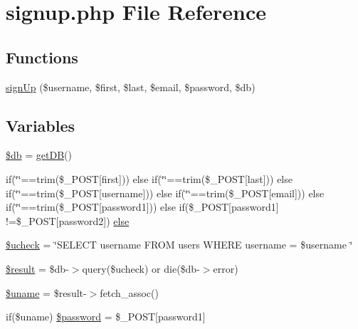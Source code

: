 \hypertarget{signup_8php}{}\section{signup.\+php File Reference}
\label{signup_8php}
\subsection*{Functions}
\begin{DoxyCompactItemize}
\item 
\mbox{\hyperlink{signup_8php_aed15c17c9da92081945e8ee167bdf7a0}{sign\+Up}} (\$username, \$first, \$last, \$email, \$password, \$db)
\end{DoxyCompactItemize}
\subsection*{Variables}
\begin{DoxyCompactItemize}
\item 
\mbox{\hyperlink{signup_8php_a1fa3127fc82f96b1436d871ef02be319}{\$db}} = \mbox{\hyperlink{database_8php_a4162847310de81b83504109485866a7c}{get\+DB}}()
\item 
if(\char`\"{}\char`\"{}==trim(\$\+\_\+\+P\+O\+ST\mbox{[}\textquotesingle{}first\textquotesingle{}\mbox{]})) else if(\char`\"{}\char`\"{}==trim(\$\+\_\+\+P\+O\+ST\mbox{[}\textquotesingle{}last\textquotesingle{}\mbox{]})) else if(\char`\"{}\char`\"{}==trim(\$\+\_\+\+P\+O\+ST\mbox{[}\textquotesingle{}username\textquotesingle{}\mbox{]})) else if(\char`\"{}\char`\"{}==trim(\$\+\_\+\+P\+O\+ST\mbox{[}\textquotesingle{}email\textquotesingle{}\mbox{]})) else if(\char`\"{}\char`\"{}==trim(\$\+\_\+\+P\+O\+ST\mbox{[}\textquotesingle{}password1\textquotesingle{}\mbox{]})) else if(\$\+\_\+\+P\+O\+ST\mbox{[}\textquotesingle{}password1\textquotesingle{}\mbox{]} !=\$\+\_\+\+P\+O\+ST\mbox{[}\textquotesingle{}password2\textquotesingle{}\mbox{]}) \mbox{\hyperlink{signup_8php_a12e81082faa4fe8fec9874c6510a4b5a}{else}}
\item 
\mbox{\hyperlink{signup_8php_ab8fb2b266e6115a51d358bee61a9173a}{\$ucheck}} = \char`\"{}S\+E\+L\+E\+CT username F\+R\+OM users W\+H\+E\+RE username = \textquotesingle{}\$username\textquotesingle{} \char`\"{}
\item 
\mbox{\hyperlink{signup_8php_a112ef069ddc0454086e3d1e6d8d55d07}{\$result}} = \$db-\/$>$query(\$ucheck) or die(\$db-\/$>$error)
\item 
\mbox{\hyperlink{signup_8php_a227a9443cabbe5e23cfc10c4371e09d1}{\$uname}} = \$result-\/$>$fetch\+\_\+assoc()
\item 
if(\$uname) \mbox{\hyperlink{signup_8php_a607686ef9f99ea7c42f4f3dd3dbb2b0d}{\$password}} = \$\+\_\+\+P\+O\+ST\mbox{[}\textquotesingle{}password1\textquotesingle{}\mbox{]}
\end{DoxyCompactItemize}


